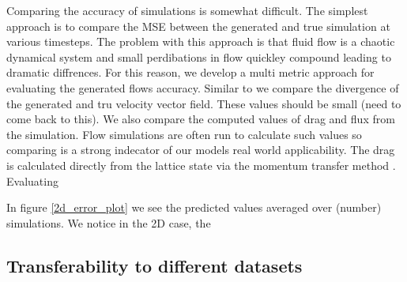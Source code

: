 \documentclass{article}
\begin{document}
Comparing the accuracy of simulations is somewhat difficult. The simplest approach is to compare the MSE between the generated and true simulation at various timesteps. The problem with this approach is that fluid flow is a chaotic dynamical system and small perdibations in flow quickley compound leading to dramatic diffrences. For this reason, we develop a multi metric approach for evaluating the generated flows accuracy. Similar to \cite{} we compare the divergence of the generated and tru velocity vector field. These values should be small (need to come back to this). We also compare the computed values of drag and flux from the simulation. Flow simulations are often run to calculate such values so comparing is a strong indecator of our models real world applicability. The drag is calculated directly from the lattice state via the momentum transfer method \cite{guo2013lattice}. Evaluating 

In figure \ref{2d_error_plot} we see the predicted values averaged over (number) simulations. We notice in the 2D case, the 

\subsection{Transferability to different datasets}
\end{document}
